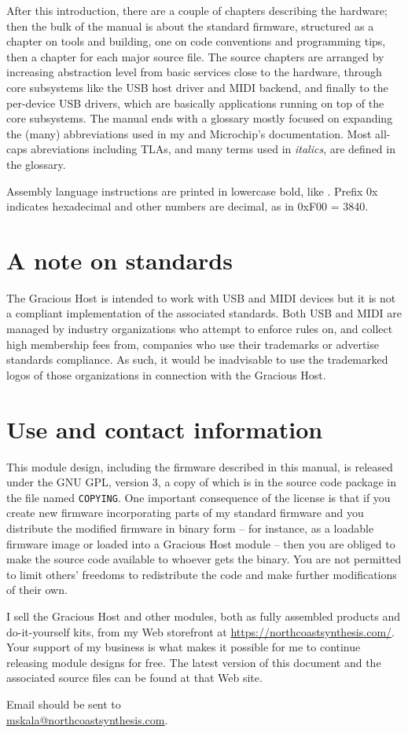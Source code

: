 After this introduction, there are a couple of chapters describing the
hardware; then the bulk of the manual is about the standard firmware,
structured as a chapter on tools and building, one on code conventions and
programming tips, then a chapter for each major source file.  The source
chapters are arranged by increasing abstraction level from basic services
close to the hardware, through core subsystems like the USB host driver and
MIDI backend, and finally to the per-device USB drivers, which are basically
applications running on top of the core subsystems.  The manual ends with a
glossary mostly focused on expanding the (many) abbreviations used in my and
Microchip's documentation.  Most all-caps abreviations including TLAs, and
many terms used in \emph{italics}, are defined in the glossary.

Assembly language instructions are printed in lowercase bold, like
.  Prefix 0x indicates hexadecimal and other numbers are decimal,
as in 0xF00 = 3840.

\section{A note on standards}

The Gracious Host is intended to work with USB and MIDI devices but it is
not a compliant implementation of the associated standards.  Both USB and
MIDI are managed by industry organizations who attempt to enforce rules on,
and collect high membership fees from, companies who use their trademarks or
advertise standards compliance.  As such, it would be inadvisable to use the
trademarked logos of those organizations in connection with the Gracious
Host.

\section{Use and contact information}

This module design, including the firmware described in this manual, is
released under the GNU GPL, version 3, a copy of which is in the source code
package in the file named \texttt{COPYING}.  One important consequence of
the license is that if you create new firmware incorporating parts of my
standard firmware and you distribute the modified firmware in binary form --
for instance, as a loadable firmware image or loaded into a Gracious Host
module -- then you are obliged to make the source code available to
whoever gets the binary.  You are not permitted to limit others' freedoms to
redistribute the code and make further modifications of their own.

I sell the Gracious Host and other modules, both as fully assembled products
and do-it-yourself kits, from my Web storefront at
\url{https://northcoastsynthesis.com/}.  Your support of my business is what
makes it possible for me to continue releasing module designs for free.  The
latest version of this document and the associated source files can be found
at that Web site.

Email should be sent to\\ \url{mskala@northcoastsynthesis.com}.
